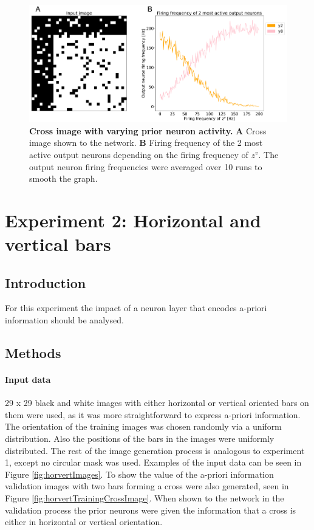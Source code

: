 \begin{figure}
  \includegraphics[width=\linewidth]{figures/horvertAdaptiveInh/YFrequency_prior.png}
  \caption{\textbf{Cross image with varying prior neuron activity.} \textbf{A} Cross image shown to the network. \textbf{B} Firing frequency of the 2 most active output neurons depending on the firing frequency of $z^v$. The output neuron firing frequencies were averaged over 10 runs to smooth the graph. }
  \label{fig:horvertAdaptiveInhibitionVariablePriorResults}
\end{figure}










\iffalse
\section{Experiment 2: Horizontal and vertical bars}
\label{section:horvert}

 \subsection{Introduction}

For this experiment the impact of a neuron layer that encodes a-priori information should be analysed.

\subsection{Methods}

\paragraph{Input data}
29 x 29 black and white images with either horizontal or vertical oriented bars on them were used, as it was more straightforward to express a-priori information. The orientation of the training images was chosen randomly via a uniform distribution. Also the positions of the bars in the images were uniformly distributed. The rest of the image generation process is analogous to experiment 1, except no circular mask was used. Examples of the input data can be seen in Figure \ref{fig:horvertImages}. To show the value of the a-priori information validation images with two bars forming a cross were also generated, seen in Figure \ref{fig:horvertTrainingCrossImage}. When shown to the network in the validation process the prior neurons were given the information that a cross is either in horizontal or vertical orientation.

